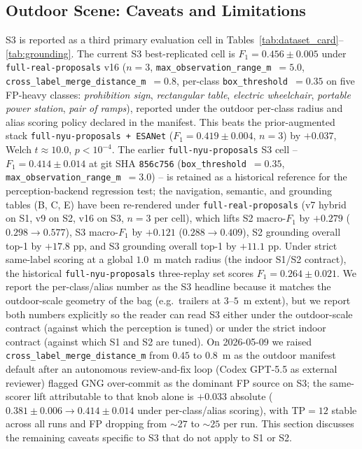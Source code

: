\subsection{Outdoor Scene: Caveats and Limitations}
\label{sec:outdoor_caveat}

S3 is reported as a third primary evaluation cell in
Tables~\ref{tab:dataset_card}--\ref{tab:grounding}. The current
S3 best-replicated cell is $F_1{=}0.456 \pm 0.005$ under
\texttt{full-real-proposals} v16 ($n{=}3$,
\texttt{max\_observation\_range\_m}~$=5.0$,
\texttt{cross\_label\_merge\_distance\_m}~$=0.8$, per-class
\texttt{box\_threshold}~$=0.35$ on five FP-heavy classes:
\textit{prohibition sign}, \textit{rectangular table},
\textit{electric wheelchair}, \textit{portable power station},
\textit{pair of ramps}), reported under the outdoor per-class
radius and alias scoring policy declared in the manifest. This
beats the prior-augmented stack \texttt{full-nyu-proposals + ESANet}
($F_1{=}0.419 \pm 0.004$, $n{=}3$) by $+0.037$, Welch
$t{\approx}10.0$, $p{<}10^{-4}$. The earlier \texttt{full-nyu-proposals} S3 cell --
$F_1{=}0.414 \pm 0.014$ at git SHA \texttt{856c756}
(\texttt{box\_threshold}~$=0.35$,
\texttt{max\_observation\_range\_m}~$=3.0$) -- is retained as a
historical reference for the perception-backend regression test;
the navigation, semantic, and grounding tables (B, C, E) have
been re-rendered under \texttt{full-real-proposals} (v7 hybrid on
S1, v9 on S2, v16 on S3, $n{=}3$ per cell), which lifts S2
macro-$F_1$ by $+0.279$ ($0.298 \rightarrow 0.577$), S3
macro-$F_1$ by $+0.121$ ($0.288 \rightarrow 0.409$), S2
grounding overall top-1 by $+17.8$ pp, and S3 grounding overall
top-1 by $+11.1$ pp. Under strict same-label scoring
at a global $1.0$~m match radius (the indoor S1/S2 contract), the
historical \texttt{full-nyu-proposals} three-replay set scores
$F_1{=}0.264 \pm 0.021$. We report the per-class/alias number as
the S3 headline because it matches the outdoor-scale geometry of
the bag (e.g.\ trailers at $3$--$5$~m extent), but we report both
numbers explicitly so the reader can read S3 either under the
outdoor-scale contract (against which the perception is tuned)
or under the strict indoor contract (against which S1 and S2 are
tuned). On 2026-05-09 we raised
\texttt{cross\_label\_merge\_distance\_m} from $0.45$ to $0.8$~m
as the outdoor manifest default after an autonomous
review-and-fix loop (Codex GPT-5.5 as external reviewer) flagged
GNG over-commit as the dominant FP source on S3; the same-scorer
lift attributable to that knob alone is $+0.033$ absolute
($0.381 \pm 0.006 \rightarrow 0.414 \pm 0.014$ under
per-class/alias scoring), with TP$=12$ stable across all runs and
FP dropping from $\sim 27$ to $\sim 25$ per run. This section
discusses the remaining caveats specific to S3 that do not apply
to S1 or S2.

